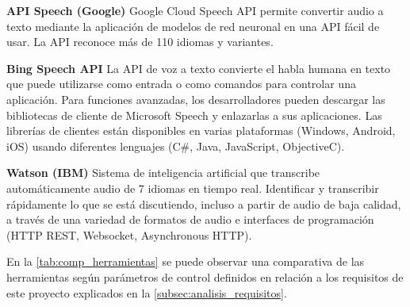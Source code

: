 \documentclass[../main.tex]{subfiles}
\begin{document}
\textbf{API Speech (Google)} Google Cloud Speech API permite convertir audio a texto mediante la aplicación de modelos de red neuronal en una API fácil de usar. La API reconoce más de 110 idiomas y variantes.\cite{apigoogle}

\textbf{Bing Speech API} La API de voz a texto convierte el habla humana en texto que puede utilizarse como entrada o como comandos para controlar una aplicación. Para funciones avanzadas, los desarrolladores pueden descargar las bibliotecas de cliente de Microsoft Speech y enlazarlas a sus aplicaciones. Las librerías de clientes están disponibles en varias plataformas (Windows, Android, iOS) usando diferentes lenguajes (C\#, Java, JavaScript, ObjectiveC).\cite{Microsoft}

\textbf{Watson (IBM)} Sistema de inteligencia artificial que transcribe automáticamente audio de 7 idiomas en tiempo real. Identificar y transcribir rápidamente lo que se está discutiendo, incluso a partir de audio de baja calidad, a través de una variedad de formatos de audio e interfaces de programación (HTTP REST, Websocket, Asynchronous HTTP).\cite{IBM2019}



En la \autoref{tab:comp_herramientas} se puede observar una comparativa de las herramientas según parámetros de control definidos en relación a los requisitos de este proyecto explicados en la \autoref{subsec:analisis_requisitos}.

\begin{table}[h]
    \centering
    \caption{Comparativa de herramientas de reconocimiento de voz.}
    \label{tab:comp_herramientas}
\end{table}
\end{document}
